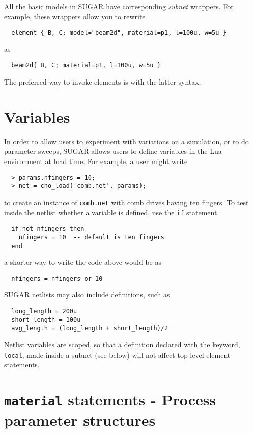 All the basic models in SUGAR have corresponding \emph{subnet} wrappers.
For example, these wrappers allow you to rewrite
\begin{verbatim}
  element { B, C; model="beam2d", material=p1, l=100u, w=5u }
\end{verbatim}
as
\begin{verbatim}
  beam2d{ B, C; material=p1, l=100u, w=5u }
\end{verbatim}
The preferred way to invoke elements is with the latter syntax.


\section{Variables}

In order to allow users to experiment with variations on a simulation,
or to do parameter sweeps, SUGAR allows users to define variables in
the Lua environment at load time.  For example, a user might write
\begin{verbatim}
  > params.nfingers = 10;
  > net = cho_load('comb.net', params);
\end{verbatim}
to create an instance of \texttt{comb.net} with comb drives having
ten fingers.  To test inside the netlist whether a variable is defined,
use the \verb|if| statement
\begin{verbatim}
  if not nfingers then
    nfingers = 10  -- default is ten fingers
  end
\end{verbatim}
a shorter way to write the code above would be as
\begin{verbatim}
  nfingers = nfingers or 10
\end{verbatim}

SUGAR netlists may also include definitions, such as
\begin{verbatim}
  long_length = 200u
  short_length = 100u
  avg_length = (long_length + short_length)/2
\end{verbatim}
Netlist variables are scoped, so that a definition declared with the
keyword, \texttt{local}, made inside
a subnet (see below) will not affect top-level element statements.


\section{\texttt{material} statements - Process parameter structures}


